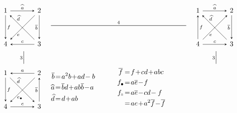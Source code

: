 \documentclass[11pt, letterpaper]{amsart}
\theoremstyle{definition}
\numberwithin{equation}{section}
\newcommand{\vmutation}[1]{  {\scriptstyle #1}{\Bigl|\Bigr.}  }
\def\nsquare{\scalebox{.85}{$\scriptscriptstyle\Box$}}
\begin{document}
\begin{figure}[ht]
\begin{equation*}
\hspace{-10pt}
\begin{array}{ccccccccc}

\begin{tikzcd}[arrows={-stealth}, sep=\sepps]
  1  \arrow[r,  "\widehat{a}", -stealth] \arrow[dr, "\widehat{d}" near start, outer sep=\outsepd, stealth-]  \arrow[d, "f", -stealth]  
  & 2  \arrow[d, swap, "\overline{b}", \snls] \arrow[dl, "e", near end, outer sep=\outsepe, -stealth]
  \\
   4 
   & 3  \arrow[l, "c", swap, \snls] 
\end{tikzcd}
 & \multicolumn{5}{c}{ \stackrel{4}{\rule[.5ex]{19.5em}{0.5pt}}}
 &
\begin{tikzcd}[arrows={-stealth}, sep=\sepps]
  1  \arrow[r,  "\widehat{a}", -stealth] \arrow[dr, "\widehat{d}" near start, outer sep=\outsepd, stealth-]  \arrow[d, "f", \snsl]  
  & 2  \arrow[d, swap, "\overline{b}",\snls] \arrow[dl, "e", near end, outer sep=\outsepe, \snsl]
  \\
   4 
   & 3  \arrow[l, "c", swap, \snsl] 
\end{tikzcd}
\\
\\[-8pt]
\vmutation{3}   & & & & & & \vmutation{3} \\[-6pt]
\\

\begin{tikzcd}[arrows={-stealth}, sep=\sepps]
  1  \arrow[r,  "a", \snsl] \arrow[dr, "\widehat{d}" near start, outer sep=\outsepd, \snls]  \arrow[d, "f", -stealth]  
  & 2  \arrow[d, swap, "\overline{b}", stealth-] \arrow[dl, "e_\bullet", near end, outer sep=\outsepe, -stealth]
  \\
   4 
   & 3  \arrow[l, "c", swap, \snsl] 
\end{tikzcd}

 &\multicolumn{2}{c}{
 \begin{aligned}
  \overline{b} &\!=\! a^2b \!+\! ad\! -b\\
\widehat{a} &\!=\! \overline{b}d\! +\! ab\overline{b}\!-\!a\\%
 \widehat{d} &\!=\! d\!+\!ab\\
 \end{aligned}
 }
& &\multicolumn{2}{c}{
\hspace{-20pt}
 \begin{aligned}
\overline{f} \,&\!=\! f\! +\! cd\! +\! abc \\
f_\bullet &\!=\! a \overline e \!-\! f\\
 f_{\nsquare} &\!=\! a \overline e \!-\! cd \!-f \\
 &\!=\!ae \!+\! a^2 \overline{f}\! -\! \overline{f}
 \end{aligned}
 }
 

\end{array}
\end{equation*}
\end{figure}
\end{document}
